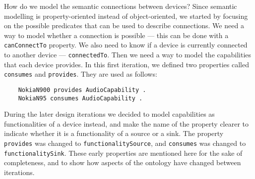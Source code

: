 
How do we model the semantic connections between devices? Since semantic modelling is property-oriented instead of object-oriented, we started by focusing on the possible predicates that can be used to describe connections. We need a way to model whether a connection is possible --- this can be done with a \texttt{canConnectTo} property. We also need to know if a device is currently connected to another device --- \texttt{connectedTo}. Then we need a way to model the capabilities that each device provides. In this first iteration, we defined two properties called \texttt{consumes} and \texttt{provides}. They are used as follows:

\begin{verbatim}
	NokiaN900 provides AudioCapability .
	NokiaN95 consumes AudioCapability .
\end{verbatim}

During the later design iterations we decided to model capabilities as functionalities of a device instead, and make the name of the property clearer to indicate whether it is a functionality of a source or a sink. The property \texttt{provides} was changed to \texttt{functionalitySource}, and \texttt{consumes} was changed to \texttt{functionalitySink}. These early properties are mentioned here for the sake of completeness, and to show how aspects of the ontology have changed between iterations.



